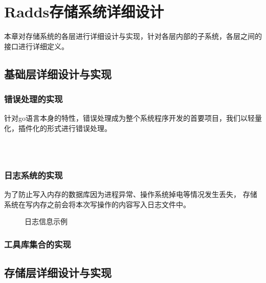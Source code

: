 \section{Radds存储系统详细设计}

	本章对存储系统的各层进行详细设计与实现，针对各层内部的子系统，各层之间的接口进行详细定义。

  \subsection{基础层详细设计与实现}
	
   	\subsubsection{错误处理的实现}

		针对go语言本身的特性，错误处理成为整个系统程序开发的首要项目，我们以轻量化，插件化的形式进行错误处理。
		
		
		\begin{lstlisting}[caption=Errors , label=code_radds_errors]

 
		\end{lstlisting}                 

	
			
   	\subsubsection{日志系统的实现}
    
	   为了防止写入内存的数据库因为进程异常、操作系统掉电等情况发生丢失，
	   存储系统在写内存之前会将本次写操作的内容写入日志文件中。


    
    \begin{figure}[H]
    	\centering
    	\caption{日志信息示例}
    	\label{img_log_sample}
    \end{figure}
    
    
   	\subsubsection{工具库集合的实现}
    

  	\subsection{存储层详细设计与实现}


